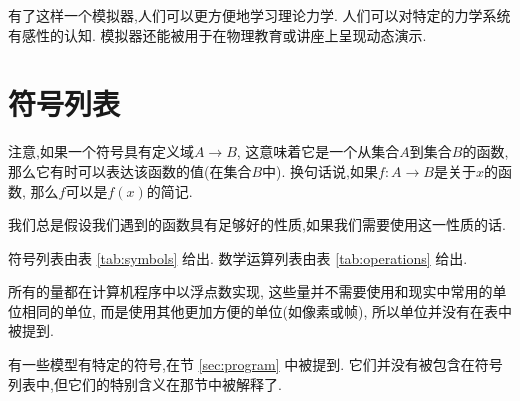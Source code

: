 \documentclass[12pt]{article}
\begin{document}
有了这样一个模拟器,人们可以更方便地学习理论力学.
人们可以对特定的力学系统有感性的认知.
模拟器还能被用于在物理教育或讲座上呈现动态演示.

\section{符号列表}

注意,如果一个符号具有定义域$A\rightarrow B$,
这意味着它是一个从集合$A$到集合$B$的函数,
那么它有时可以表达该函数的值(在集合$B$中).
换句话说,如果$f:A\rightarrow B$是关于$x$的函数,
那么$f$可以是$f\left(x\right)$的简记.

我们总是假设我们遇到的函数具有足够好的性质,如果我们需要使用这一性质的话.

符号列表由表 \ref{tab:symbols} 给出.
数学运算列表由表 \ref{tab:operations} 给出.

所有的量都在计算机程序中以浮点数实现,
这些量并不需要使用和现实中常用的单位相同的单位,
而是使用其他更加方便的单位(如像素或帧),
所以单位并没有在表中被提到.

有一些模型有特定的符号,在节 \ref{sec:program} 中被提到.
它们并没有被包含在符号列表中,但它们的特别含义在那节中被解释了.
\end{document}
